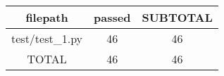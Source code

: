 \begin{tabular}{|c|c|c|}
\hline
filepath & passed & SUBTOTAL \\
\hline
test/test\_1.py & 46 & 46 \\
\hline
TOTAL & 46 & 46 \\
\hline
\end{tabular}
